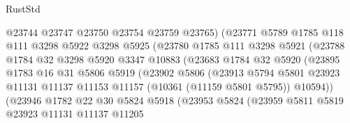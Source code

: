 \begin{lexlean}{RustStd}
\begin{coremodule}
                            @23744
                            @23747
                            @23750
                            @23754
                            @23759
                            @23765)
                          (@23771
                            @5789
                            @1785
                            @118
                            @111
                            @3298
                            @5922
                            @3298
                            @5925
                            (@23780
                              @1785
                              @111
                              @3298
                              @5921
                              (@23788
                                @1784
                                @32
                                @3298
                                @5920
                                @3347
                                @10883
                                (@23683
                                  @1784
                                  @32
                                  @5920
                                  (@23895
                                    @1783
                                    @16
                                    @31
                                    @5806
                                    @5919
                                    (@23902
                                      @5806
                                      (@23913
                                        @5794
                                        @5801
                                        @23923
                                        @11131
                                        @11137
                                        @11153
                                        @11157
                                        (@10361 (@11159 @5801 @5795))
                                        @10594))
                                    (@23946
                                      @1782
                                      @22
                                      @30
                                      @5824
                                      @5918
                                      (@23953
                                        @5824
                                        (@23959
                                          @5811
                                          @5819
                                          @23923
                                          @11131
                                          @11137
                                          @11205

\end{coremodule}
\end{lexlean}
